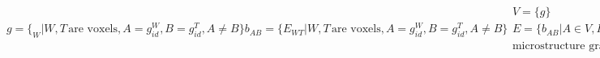 \begin{subequations}

\begin{equation}
g=\{_{W} | W, T\, \text{are voxels}, A = g^W_{id}, B = g^T_{id}, A \neq B\}
\label{eq:graindef}
\end{equation}

\begin{equation}
b_{AB}=\{E_{WT} | W, T\, \text{are voxels}, A = g^W_{id}, B = g^T_{id}, A \neq B\}
\label{eq:gbdef}
\end{equation}

\begin{equation}
\begin{aligned}
V=\{g\} \\
E=\{b_{AB} | A \in V, B \in V\} \\
\text{microstructure graph} = (V, E)
\end{aligned}
\label{eq:micrograph}
\end{equation}

\end{subequations}